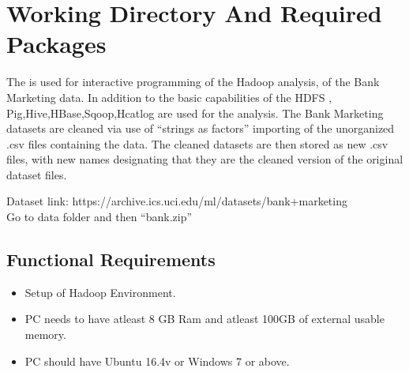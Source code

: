   
\section{Working Directory And Required Packages}
 
 The  is used for interactive programming of the Hadoop analysis, of the Bank Marketing data. In addition to the basic capabilities of the HDFS , Pig,Hive,HBase,Sqoop,Hcatlog  are used for the analysis. The Bank Marketing datasets are cleaned via use of “strings as factors” importing of the unorganized .csv files containing the data. The cleaned datasets are then stored as new .csv files, with new names designating that they are the cleaned version of the original dataset files.
 
 Dataset link: https://archive.ics.uci.edu/ml/datasets/bank+marketing\\
 Go to data folder and then “bank.zip”
\subsection{Functional Requirements}
\begin{itemize}
	\item Setup of Hadoop Environment.
	\item PC needs to have atleast 8 GB Ram and atleast 100GB  of external usable memory.
	\item PC should have Ubuntu 16.4v or Windows 7 or above.
\end{itemize}
